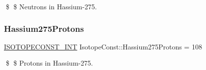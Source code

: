 \$ \$ Neutrons in Hassium-\/275. \mbox{\label{group___isotope_const-_hassium-_hs275_gacfd0cac56b1f7d1a3b79c3f3e4dbf591}} 
\subsubsection{\texorpdfstring{Hassium275\+Protons}{Hassium275Protons}}
{\footnotesize\ttfamily \mbox{\hyperlink{group___isotope_const-_macros_ga5f18360b3e99483a35c32d789e62621c}{I\+S\+O\+T\+O\+P\+E\+C\+O\+N\+S\+T\+\_\+\+I\+NT}} Isotope\+Const\+::\+Hassium275\+Protons = 108}

\$ \$ Protons in Hassium-\/275. 